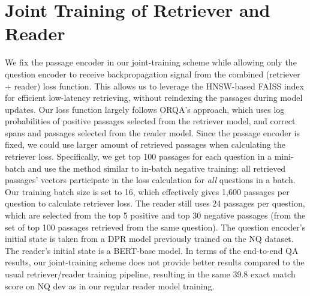 \documentclass[11pt,a4paper]{article}
\def\model/{DPR}
\begin{document}
 

\section{Joint Training of Retriever and Reader}
\label{sec:joint}

We fix the passage encoder in our joint-training scheme while allowing only the question encoder to receive backpropagation signal from the combined (retriever + reader) loss function.
This allows us to leverage the HNSW-based FAISS index for efficient low-latency retrieving, without reindexing the passages during model updates.
Our loss function largely follows ORQA's approach, which uses log probabilities of positive passages selected from the retriever model, and correct spans and passages selected from the reader model.
Since the passage encoder is fixed, we could use larger amount of retrieved passages when calculating the retriever loss.
Specifically, we get top 100 passages for each question in a mini-batch and use the method similar to in-batch negative training: all retrieved passages' vectors participate in the loss calculation for \emph{all} questions in a batch. 
Our training batch size is set to 16, which effectively gives 1,600 passages per question to calculate retriever loss.
The reader still uses 24 passages per question, which are selected from the top 5 positive and top 30 negative passages (from the set of top 100 passages retrieved from the same question).
The question encoder's initial state is taken from a \model/ model previously trained on the NQ dataset.
The reader's initial state is a BERT-base model.
In terms of the end-to-end QA results, our joint-training scheme does not provide better results compared to the usual retriever/reader training pipeline, resulting in the same 39.8 exact match score on NQ dev as in our regular reader model training.






 
\end{document}
